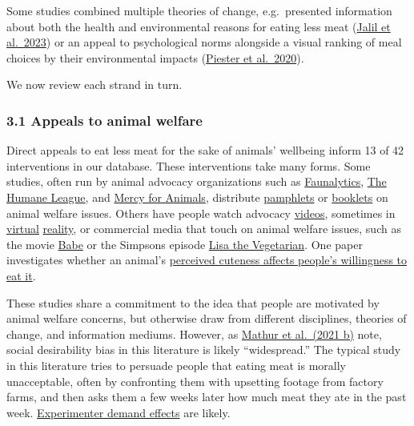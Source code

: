 \documentclass[
  letterpaper,
  DIV=11,
  numbers=noendperiod]{scrartcl}
\begin{document}
Some studies combined multiple theories of change, e.g.~presented
information about both the health and environmental reasons for eating
less meat (\href{https://doi.org/10.1038/s43016-023-00712-1}{Jalil et
al.~2023}) or an appeal to psychological norms alongside a visual
ranking of meal choices by their environmental impacts
(\href{https://doi.org/10.1016/j.appet.2020.104842}{Piester et
al.~2020}).

We now review each strand in turn.

\hypertarget{appeals-to-animal-welfare}{%
\subsubsection{3.1 Appeals to animal
welfare}\label{appeals-to-animal-welfare}}

Direct appeals to eat less meat for the sake of animals' wellbeing
inform 13 of 42 interventions in our database. These interventions take
many forms. Some studies, often run by animal advocacy organizations
such as
\href{https://forum.effectivealtruism.org/topics/faunalytics}{Faunalytics},
\href{https://forum.effectivealtruism.org/topics/the-humane-league}{The
Humane League}, and
\href{https://www.google.com/search?q=mercy+for+animals+effective+altruism+forum\&oq=mercy+for+animals+effective+altruism+forum\&gs_lcrp=EgZjaHJvbWUyBggAEEUYOTIHCAEQIRigAdIBCDcxNDRqMGoxqAIAsAIA\&sourceid=chrome\&ie=UTF-8}{Mercy
for Animals}, distribute
\href{https://www.sciencedirect.com/science/article/abs/pii/S0195666322000721?via\%3Dihub}{pamphlets}
or \href{https://osf.io/nwcgf}{booklets} on animal welfare issues.
Others have people watch advocacy
\href{https://mercyforanimals.org/blog/impact-study/}{videos}, sometimes
in \href{https://doi.org/10.31219/osf.io/fapu8}{virtual}
\href{https://papers.ssrn.com/sol3/papers.cfm?abstract_id=3938994}{reality},
or commercial media that touch on animal welfare issues, such as the
movie
\href{https://effectivethesis.org/wp-content/uploads/2022/03/THE-INFLUENCE-OF-MOVIE-ON-BEHAVIORAL-CHANGE-IN-INDIVIDUAL-MEAT-AND-DAIRY-PRODUCTS-CONSUMPTION.pdf}{Babe}
or the Simpsons episode
\href{https://onlinelibrary.wiley.com/doi/10.1111/j.1747-0080.2010.01446.x}{Lisa
the Vegetarian}. One paper investigates whether an animal's
\href{https://www.sciencedirect.com/science/article/abs/pii/S0195666317306190?via\%3Dihub}{perceived
cuteness affects people's willingness to eat it}.

These studies share a commitment to the idea that people are motivated
by animal welfare concerns, but otherwise draw from different
disciplines, theories of change, and information mediums. However, as
\href{https://www.sciencedirect.com/science/article/pii/S0195666321001847}{Mathur
et al.~(2021 b)} note, social desirability bias in this literature is
likely ``widespread.'' The typical study in this literature tries to
persuade people that eating meat is morally unacceptable, often by
confronting them with upsetting footage from factory farms, and then
asks them a few weeks later how much meat they ate in the past week.
\href{https://www.elgaronline.com/display/edcoll/9781788110556/9781788110556.00031.xml}{Experimenter
demand effects} are likely.
\end{document}
